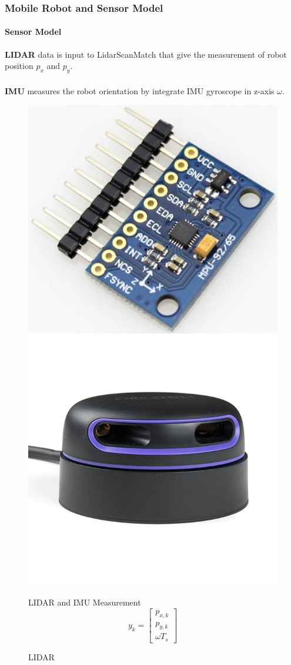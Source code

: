 \begin{frame}
	\frametitle{Mobile Robot and Sensor Model}
	\framesubtitle{Sensor Model}
	\textbf{LIDAR} data is input to LidarScanMatch that give the measurement of robot position \(p_x\) and \(p_y\).\\
	\hspace{\linewidth}\\
	\textbf{IMU} measures the robot orientation by integrate IMU gyroscope in z-axis \(\omega\).
	
	\begin{figure}
		\centering
		\begin{minipage}{.3\textwidth}
			\caption{IMU}
			\centering
			\includegraphics[width=.5\linewidth]{image/imu}
		\end{minipage}%
		\begin{minipage}{.3\textwidth}
			\caption{LIDAR}
			\centering
			\includegraphics[width=.5\linewidth]{image/lidar}
		\end{minipage}%
		\begin{minipage}{.3\textwidth}
			\begin{block}{LIDAR and IMU Measurement}
				\begin{equation}
					y_k=
					\begin{bmatrix}
						p_{x,k}\\
						p_{y,k}\\
						\omega T_s	
					\end{bmatrix}
				\end{equation}
			\end{block}
		\end{minipage}
	\end{figure}
\end{frame}

